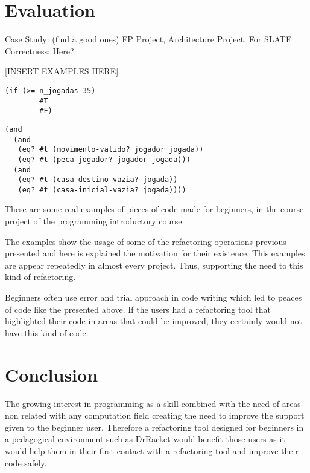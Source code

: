 \section{Evaluation} %
Case Study: (find a good ones) FP Project, Architecture Project. For SLATE
Correctness: Here?

[INSERT EXAMPLES HERE]
\begin{lstlisting}[basicstyle=\ttfamily, caption="example"]
  (if (>= n_jogadas 35)
        #T
        #F)
\end{lstlisting}

\begin{lstlisting}[basicstyle=\ttfamily, caption="Refactoring and expression"]
(and
  (and
   (eq? #t (movimento-valido? jogador jogada))
   (eq? #t (peca-jogador? jogador jogada)))
  (and
   (eq? #t (casa-destino-vazia? jogada))
   (eq? #t (casa-inicial-vazia? jogada))))
\end{lstlisting}


These are some real examples of pieces of code made for beginners, in the course
project of the programming introductory course.



The examples show the usage of some of the refactoring operations previous presented
and here is explained the motivation for their existence.
This examples are appear repeatedly in almost every project.
Thus, supporting the need to this kind of refactoring.

Beginners often use error and trial approach in code writing which led %
to peaces of code like the presented above.
If the users had a refactoring tool that highlighted their code in areas that
could be improved, they certainly would not have this kind of code.


\section{Conclusion}



The growing interest in programming as a skill combined with the need of areas
non related with any computation field creating the need to improve the support
given to the beginner user. %
Therefore a refactoring tool designed for beginners in a pedagogical environment such as DrRacket %
 would benefit those users as it would help them in their first contact with a
 refactoring tool and improve their code safely. %

